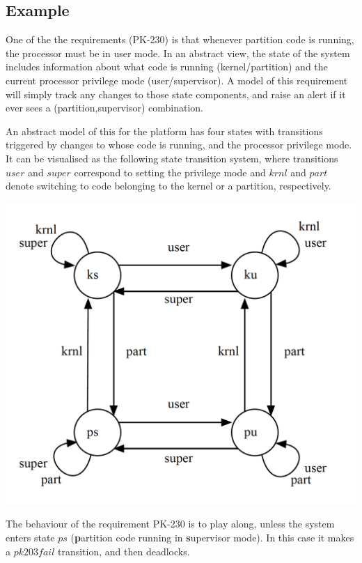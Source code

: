 \subsection{Example}

One of the the requirements (PK-230) is that whenever partition code is running,
the processor must be in user mode.
In an abstract view,
the state of the system includes information about
what code is running (kernel/partition)
and the current processor privilege mode (user/supervisor).
A model of this requirement will simply track any changes
to those state components,
and raise an alert if it ever sees a (partition,supervisor) combination.

An abstract model of this for the platform
has four states with transitions triggered
by changes to whose code is running, and the processor privilege mode.
It can be visualised as the following state transition system,
where transitions $user$ and $super$ correspond to setting the privilege mode
and $krnl$ and $part$ denote switching to code belonging to the kernel or
a partition, respectively.

\includegraphics[scale=0.35]{images/CodeModelLTS}

The behaviour of the requirement PK-230 is to play along,
unless the system enters state $ps$
(\textbf{p}artition code running in \textbf{s}upervisor mode).
In this case it makes a $pk203fail$ transition, and then deadlocks.

